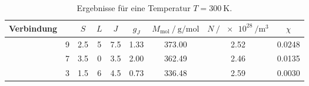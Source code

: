 \begin{table}
	\centering
	\caption{Ergebnisse für eine Temperatur $T = \qty{300}{\kelvin}$.}
	\label{tab:zahlen}
	\begin{tabular}{c |
			S[table-format=1.0]
			S[table-format=1.1]
			S[table-format=1.0]
			S[table-format=1.1]
			S[table-format=1.2]
			S[table-format=3.2]
			S[table-format=1.2]
			S[table-format=1.4]}
		\toprule
		Verbindung &  & $S$ & $L$ & $J$ & $g_J$ &
		{$M_\text{mol} \mathbin{/} \unit{\gram\per\mole}$} &
		{$N \mathbin{/} \qty{e28}{\per\cubic\meter}$} & $\chi$ \\
		\midrule
		 & 9 & 2.5 & 5 & 7.5 & 1.33 & 373.00 & 2.52 & 0.0248 \\
		 & 7 & 3.5 & 0 & 3.5 & 2.00 & 362.49 & 2.46 & 0.0135 \\
		 & 3 & 1.5 & 6 & 4.5 & 0.73 & 336.48 & 2.59 & 0.0030 \\
		\bottomrule
	\end{tabular}
\end{table}
